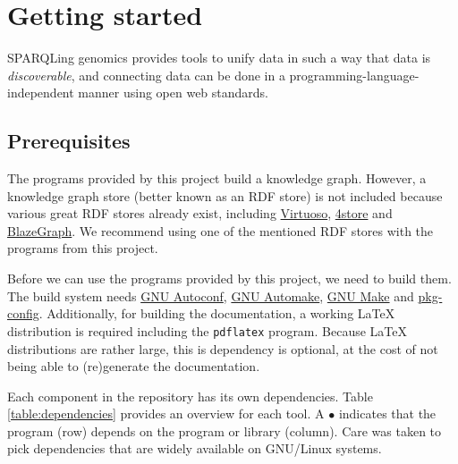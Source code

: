 \chapter{Getting started}

  SPARQLing genomics provides tools to unify data in such a way that data
  is \emph{discoverable}, and connecting data can be done in a
  programming-language-independent manner using open web standards.

\section{Prerequisites}
\label{sec:prerequisites}

  The programs provided by this project build a knowledge graph.  However,
  a knowledge graph store (better known as an RDF store) is not included
  because various great RDF stores already exist, including
  \href{https://virtuoso.openlinksw.com/}{Virtuoso},
  \href{https://github.com/4store/4store}{4store} and
  \href{https://www.blazegraph.com/}{BlazeGraph}.  We recommend using one of
  the mentioned RDF stores with the programs from this project.

  Before we can use the programs provided by this project, we need to build
  them.  The build system needs
  \href{https://www.gnu.org/software/autoconf}{GNU Autoconf},
  \href{https://www.gnu.org/software/automake}{GNU Automake},
  \href{https://www.gnu.org/software/make}{GNU Make} and
  \href{https://www.freedesktop.org/wiki/Software/pkg-config/}{pkg-config}.
  Additionally, for building the documentation, a working \LaTeX{} distribution is
  required including the \texttt{pdflatex} program.  Because \LaTeX{} distributions
  are rather large, this is dependency is optional, at the cost of not being able
  to (re)generate the documentation.

  Each component in the repository has its own dependencies.  Table
  \ref{table:dependencies} provides an overview for each tool.  A $\bullet{}$
  indicates that the program (row) depends on the program or library (column).
  Care was taken to pick dependencies that are widely available on GNU/Linux
  systems.

